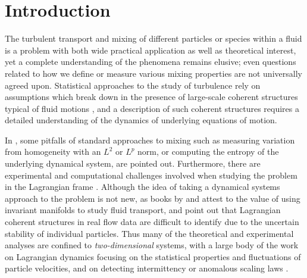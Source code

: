

\section{Introduction}
\label{s:intro}

The turbulent transport and mixing of different particles or species 
within a fluid is a problem with both wide practical application as well 
as theoretical interest, yet a complete understanding of the phenomena 
remains elusive; even questions related to how we define or measure 
various mixing properties are not universally agreed upon. Statistical approaches to the study of turbulence \citep{frisch,EgeChi22,ABBBBB08} rely on assumptions
 which break down in the presence of large-scale coherent structures typical of
 fluid motions \citep{Holmes96, MHPRS07}, and a description of such coherent structures requires a detailed
 understanding of the dynamics of underlying equations of motion. 
 
 In 
\citet{MaMPe05}, some pitfalls of standard approaches to mixing such as measuring 
variation from homogeneity with an $L^2$ or $L^p$ norm, or computing the 
entropy of the underlying dynamical system, are pointed out. Furthermore, 
there are experimental and computational challenges involved when 
studying the problem in the Lagrangian frame 
\citep{MHPRS07,ABBBBB08,BrLiEc06,MoLePi04}. Although the idea of taking a 
dynamical systems approach to the problem is not new, as books by 
\citet{Botti89} and %
\citet{Wiggins1992} attest to the value of
using invariant manifolds to study fluid transport, \citet{MHPRS07} and 
\citet{Haller02} point out that Lagrangian coherent structures in 
real flow data are difficult to identify due to the uncertain stability 
of individual particles. Thus many of the theoretical and experimental 
analyses are confined to \emph{two-dimensional} systems, with a large 
body of the work on Lagrangian dynamics focusing on the statistical 
properties and fluctuations of particle velocities, and on detecting 
intermittency or anomalous scaling laws 
\citep{EgeChi22,MoLePi04,ABBBBB08,FaGaVe01}. 

